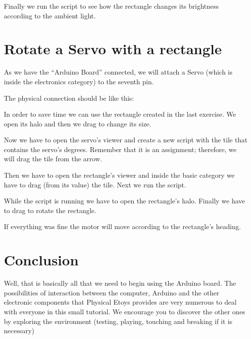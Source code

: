 \documentclass[english]{etoys-guide}
\begin{document}

Finally we run the script to see how the rectangle changes its brightness
according to the ambient light. 

\section{Rotate a Servo with a rectangle}

As we have the “Arduino Board” connected, we will attach a Servo (which is
inside the electronics category) to the seventh pin. 


The physical connection should be like this: 


In order to save time we can use the rectangle created in the last exercise. We
open its halo and then we drag  to change its size. 


Now we have to open the servo’s viewer and create a new script with the tile
that contains the servo’s degrees. Remember that it is an assignment;
therefore, we will drag the tile from the  arrow. 


Then we have to open the rectangle’s viewer and inside the basic category we
have to drag (from its value) the  tile. Next we run the script. 


While the script is running we have to open the rectangle’s halo. Finally we
have to drag  to rotate the rectangle. 


If everything was fine the motor will move according to the rectangle’s
heading. 

\section{Conclusion}

Well, that is basically all that we need to begin using the Arduino board. The
possibilities of interaction between the computer, Arduino and the other
electronic components that Physical Etoys provides are very numerous to deal
with everyone in this small tutorial. We encourage you to discover the other
ones by exploring the environment (testing, playing, touching and breaking if
it is necessary) 
\end{document}

